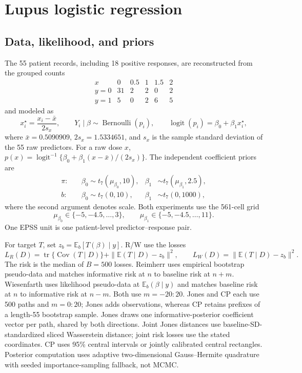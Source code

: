 \documentclass[11pt]{article}
\newcommand{\E}{\mathbb E}
\newcommand{\logit}{\operatorname{logit}}
\begin{document}
\section{Lupus logistic regression}

\subsection{Data, likelihood, and priors}
The 55 patient records, including 18 positive responses, are reconstructed
from the grouped counts
\[
\begin{array}{c|rrrrr}
 x&0&0.5&1&1.5&2\\\hline
 y=0&31&2&2&0&2\\
 y=1&5&0&2&6&5
\end{array}
\]
and modeled as
\[
 x_i^\star=\frac{x_i-\bar x}{2s_x},\qquad
 Y_i\mid\beta\sim\operatorname{Bernoulli}(p_i),\qquad
 \logit(p_i)=\beta_0+\beta_1x_i^\star,
\]
where $\bar x=0.5090909$, $2s_x=1.5334651$, and $s_x$ is the
sample standard deviation of the 55 raw predictors. For a raw dose $x$,
$p(x)=\logit^{-1}\{\beta_0+\beta_1(x-\bar x)/(2s_x)\}$.
The independent coefficient priors are
\begin{align*}
 \pi:\quad&\beta_0\sim t_7(\mu_{\beta_0},10),
             &\beta_1&\sim t_7(\mu_{\beta_1},2.5),\\
 b:\quad&\beta_0\sim t_7(0,10),
             &\beta_1&\sim t_7(0,1000),
\end{align*}
where the second argument denotes scale. Both experiments use the 561-cell grid
\[
 \mu_{\beta_0}\in\{-5,-4.5,\ldots,3\},\qquad
 \mu_{\beta_1}\in\{-5,-4.5,\ldots,11\}.
\]
One EPSS unit is one patient-level predictor--response pair.

For target $T$, set $z_b=\E_b[T(\beta)\mid y]$. R/W use the losses
\[
 L_R(D)=\operatorname{tr}\{\operatorname{Cov}(T\mid D)\}
       +\|\E(T\mid D)-z_b\|^2,\qquad
 L_W(D)=\|\E(T\mid D)-z_b\|^2.
\]
The risk is the median of $B=500$ losses. Reimherr uses empirical bootstrap
pseudo-data and matches informative risk at $n$ to baseline risk at $n+m$.
Wiesenfarth uses likelihood pseudo-data at $\E_b(\beta\mid y)$ and matches
baseline risk at $n$ to informative risk at $n-m$. Both use $m=-20{:}20$.
Jones and CP each use 500 paths and $m=0{:}20$; Jones adds observations,
whereas CP retains prefixes of a length-55 bootstrap sample.
Jones draws one informative-posterior coefficient vector per path, shared
by both directions. Joint Jones distances use baseline-SD-standardized
sliced Wasserstein distance; joint risk losses use the stated coordinates.
CP uses 95\% central intervals or jointly calibrated central rectangles.
Posterior computation uses adaptive two-dimensional Gauss--Hermite
quadrature with seeded importance-sampling fallback, not MCMC.
\end{document}

